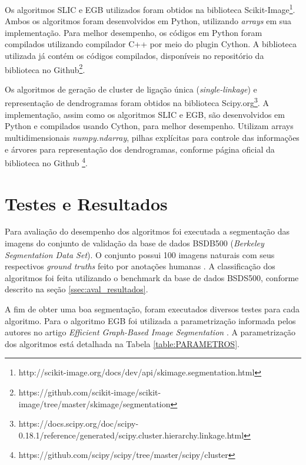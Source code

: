 \begin{document}
Os algoritmos SLIC e EGB utilizados foram obtidos na biblioteca Scikit-Image\footnote{http://scikit-image.org/docs/dev/api/skimage.segmentation.html}. Ambos os algoritmos foram desenvolvidos em Python, utilizando \textit{arrays} em sua implementação. Para melhor desempenho, os códigos em Python foram compilados utilizando compilador C++ por meio do plugin Cython. A biblioteca utilizada já contém os códigos compilados, disponíveis no repositório da biblioteca no Github\footnote{https://github.com/scikit-image/scikit-image/tree/master/skimage/segmentation}.

Os algoritmos de geração de cluster de ligação única (\textit{single-linkage}) e representação de dendrogramas foram obtidos na biblioteca Scipy.org\footnote{https://docs.scipy.org/doc/scipy-0.18.1/reference/generated/scipy.cluster.hierarchy.linkage.html}. A implementação, assim como os algoritmos SLIC e EGB, são desenvolvidos em Python e compilados usando Cython, para melhor desempenho. Utilizam arrays multidimensionais \textit{numpy.ndarray}, pilhas explícitas para controle das informações e árvores para representação dos dendrogramas, conforme página oficial da biblioteca no Github \footnote{https://github.com/scipy/scipy/tree/master/scipy/cluster}.


\section{Testes e Resultados} \label{sec:testes}

Para avaliação do desempenho dos algoritmos foi executada a segmentação das imagens do conjunto de validação da base de dados BSDB500 (\textit{Berkeley Segmentation Data Set}). O conjunto possui 100 imagens naturais com seus respectivos \textit{ground truths} feito por anotações humanas \cite{BSDS500}. A classificação dos algoritmos foi feita utilizando o benchmark da base de dados BSDS500, conforme descrito na seção \ref{ssec:aval_resultados}.

A  fim de obter uma boa segmentação, foram executados diversos testes para cada algoritmo. Para o algoritmo EGB foi utilizada a parametrização informada pelos autores no artigo \textit{Efficient Graph-Based Image Segmentation} \cite{FELZENSZWALB}. A parametrização dos algoritmos está detalhada na Tabela \ref{table:PARAMETROS}.
\end{document}
